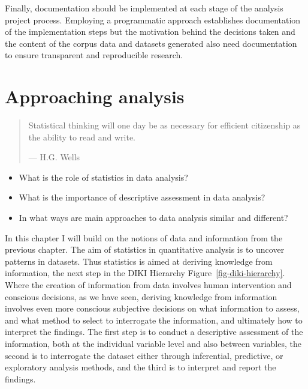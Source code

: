 \documentclass[
  letterpaper,
]{latex/krantz}
\providecommand{\tightlist}{%
  \setlength{\itemsep}{0pt}\setlength{\parskip}{0pt}}\usepackage{longtable,booktabs,array}
\begin{document}
Finally, documentation should be implemented at each stage of the
analysis project process. Employing a programmatic approach establishes
documentation of the implementation steps but the motivation behind the
decisions taken and the content of the corpus data and datasets
generated also need documentation to ensure transparent and reproducible
research.

\hypertarget{sec-approaching-analysis}{%
\chapter{Approaching analysis}\label{sec-approaching-analysis}}

\begin{quote}
Statistical thinking will one day be as necessary for efficient
citizenship as the ability to read and write.

--- H.G. Wells
\end{quote}

\begin{tcolorbox}[enhanced jigsaw, opacitybacktitle=0.6, breakable, colframe=quarto-callout-note-color-frame, arc=.35mm, left=2mm, leftrule=.75mm, title=\textcolor{quarto-callout-note-color}{\faInfo}\hspace{0.5em}{Keys}, opacityback=0, colback=white, toptitle=1mm, rightrule=.15mm, titlerule=0mm, bottomtitle=1mm, bottomrule=.15mm, coltitle=black, colbacktitle=quarto-callout-note-color!10!white, toprule=.15mm]

\begin{itemize}
\tightlist
\item
  What is the role of statistics in data analysis?
\item
  What is the importance of descriptive assessment in data analysis?
\item
  In what ways are main approaches to data analysis similar and
  different?
\end{itemize}

\end{tcolorbox}

In this chapter I will build on the notions of data and information from
the previous chapter. The aim of statistics in quantitative analysis is
to uncover patterns in datasets. Thus statistics is aimed at deriving
knowledge from information, the next step in the DIKI Hierarchy
Figure~\ref{fig-diki-hierarchy}. Where the creation of information from
data involves human intervention and conscious decisions, as we have
seen, deriving knowledge from information involves even more conscious
subjective decisions on what information to assess, and what method to
select to interrogate the information, and ultimately how to interpret
the findings. The first step is to conduct a descriptive assessment of
the information, both at the individual variable level and also between
variables, the second is to interrogate the dataset either through
inferential, predictive, or exploratory analysis methods, and the third
is to interpret and report the findings.
\end{document}
